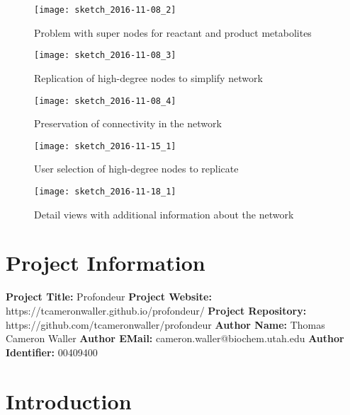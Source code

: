 \begin{figure}[t]
\texttt{[image: sketch\_2016-11-08\_2]}
\centering
\caption{Problem with super nodes for reactant and product metabolites}
\label{fig:2016-11-08_2}
\end{figure}

\begin{figure}[t]
\texttt{[image: sketch\_2016-11-08\_3]}
\centering
\caption{Replication of high-degree nodes to simplify network}
\label{fig:2016-11-08_3}
\end{figure}

\begin{figure}[t]
\texttt{[image: sketch\_2016-11-08\_4]}
\centering
\caption{Preservation of connectivity in the network}
\label{fig:2016-11-08_4}
\end{figure}

\begin{figure}[t]
\texttt{[image: sketch\_2016-11-15\_1]}
\centering
\caption{User selection of high-degree nodes to replicate}
\label{fig:2016-11-15_1}
\end{figure}

\begin{figure}[t]
\texttt{[image: sketch\_2016-11-18\_1]}
\centering
\caption{Detail views with additional information about the network}
\label{fig:2016-11-18_1}
\end{figure}



\section{Project Information}
\noindent
\textbf{Project Title:} Profondeur\newline
\textbf{Project Website:} https://tcameronwaller.github.io/profondeur/\newline
\textbf{Project Repository:} https://github.com/tcameronwaller/profondeur\newline
\textbf{Author Name:} Thomas Cameron Waller\newline
\textbf{Author EMail:} cameron.waller@biochem.utah.edu\newline
\textbf{Author Identifier:} 00409400

\section{Introduction}


